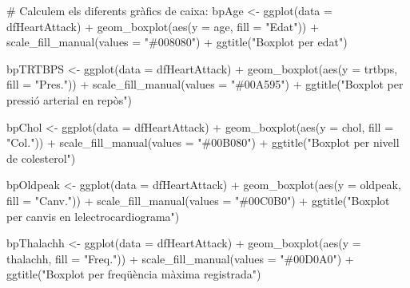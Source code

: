 \documentclass[
]{article}
\newenvironment{Shaded}{\begin{snugshade}}{\end{snugshade}}
\newcommand{\AttributeTok}[1]{\textcolor[rgb]{0.80,0.80,0.80}{#1}}
\newcommand{\CommentTok}[1]{\textcolor[rgb]{0.50,0.62,0.50}{#1}}
\newcommand{\FunctionTok}[1]{\textcolor[rgb]{0.94,0.94,0.56}{#1}}
\newcommand{\NormalTok}[1]{\textcolor[rgb]{0.80,0.80,0.80}{#1}}
\newcommand{\OtherTok}[1]{\textcolor[rgb]{0.94,0.94,0.56}{#1}}
\newcommand{\SpecialCharTok}[1]{\textcolor[rgb]{0.86,0.64,0.64}{#1}}
\newcommand{\StringTok}[1]{\textcolor[rgb]{0.80,0.58,0.58}{#1}}
\begin{document}
\begin{Shaded}
\begin{Highlighting}[]
\CommentTok{\# Calculem els diferents gràfics de caixa:}
\NormalTok{bpAge }\OtherTok{\textless{}{-}} \FunctionTok{ggplot}\NormalTok{(}\AttributeTok{data =}\NormalTok{ dfHeartAttack) }\SpecialCharTok{+}
  \FunctionTok{geom\_boxplot}\NormalTok{(}\FunctionTok{aes}\NormalTok{(}\AttributeTok{y =}\NormalTok{ age, }\AttributeTok{fill =} \StringTok{"Edat"}\NormalTok{)) }\SpecialCharTok{+}
  \FunctionTok{scale\_fill\_manual}\NormalTok{(}\AttributeTok{values =} \StringTok{"\#008080"}\NormalTok{) }\SpecialCharTok{+} 
  \FunctionTok{ggtitle}\NormalTok{(}\StringTok{"Boxplot per edat"}\NormalTok{)}

\NormalTok{bpTRTBPS }\OtherTok{\textless{}{-}} \FunctionTok{ggplot}\NormalTok{(}\AttributeTok{data =}\NormalTok{ dfHeartAttack) }\SpecialCharTok{+}
  \FunctionTok{geom\_boxplot}\NormalTok{(}\FunctionTok{aes}\NormalTok{(}\AttributeTok{y =}\NormalTok{ trtbps, }\AttributeTok{fill =} \StringTok{"Pres."}\NormalTok{)) }\SpecialCharTok{+}
  \FunctionTok{scale\_fill\_manual}\NormalTok{(}\AttributeTok{values =} \StringTok{"\#00A595"}\NormalTok{) }\SpecialCharTok{+} 
  \FunctionTok{ggtitle}\NormalTok{(}\StringTok{"Boxplot per pressió arterial en repòs"}\NormalTok{)}

\NormalTok{bpChol }\OtherTok{\textless{}{-}} \FunctionTok{ggplot}\NormalTok{(}\AttributeTok{data =}\NormalTok{ dfHeartAttack) }\SpecialCharTok{+}
  \FunctionTok{geom\_boxplot}\NormalTok{(}\FunctionTok{aes}\NormalTok{(}\AttributeTok{y =}\NormalTok{ chol, }\AttributeTok{fill =} \StringTok{"Col."}\NormalTok{)) }\SpecialCharTok{+}
  \FunctionTok{scale\_fill\_manual}\NormalTok{(}\AttributeTok{values =} \StringTok{"\#00B080"}\NormalTok{) }\SpecialCharTok{+} 
  \FunctionTok{ggtitle}\NormalTok{(}\StringTok{"Boxplot per nivell de colesterol"}\NormalTok{)}

\NormalTok{bpOldpeak }\OtherTok{\textless{}{-}} \FunctionTok{ggplot}\NormalTok{(}\AttributeTok{data =}\NormalTok{ dfHeartAttack) }\SpecialCharTok{+}
  \FunctionTok{geom\_boxplot}\NormalTok{(}\FunctionTok{aes}\NormalTok{(}\AttributeTok{y =}\NormalTok{ oldpeak, }\AttributeTok{fill =} \StringTok{"Canv."}\NormalTok{)) }\SpecialCharTok{+}
  \FunctionTok{scale\_fill\_manual}\NormalTok{(}\AttributeTok{values =} \StringTok{"\#00C0B0"}\NormalTok{) }\SpecialCharTok{+} 
  \FunctionTok{ggtitle}\NormalTok{(}\StringTok{"Boxplot per canvis en l\textquotesingle{}electrocardiograma"}\NormalTok{)}

\NormalTok{bpThalachh }\OtherTok{\textless{}{-}} \FunctionTok{ggplot}\NormalTok{(}\AttributeTok{data =}\NormalTok{ dfHeartAttack) }\SpecialCharTok{+}
  \FunctionTok{geom\_boxplot}\NormalTok{(}\FunctionTok{aes}\NormalTok{(}\AttributeTok{y =}\NormalTok{ thalachh, }\AttributeTok{fill =} \StringTok{"Freq."}\NormalTok{)) }\SpecialCharTok{+}
  \FunctionTok{scale\_fill\_manual}\NormalTok{(}\AttributeTok{values =} \StringTok{"\#00D0A0"}\NormalTok{) }\SpecialCharTok{+} 
  \FunctionTok{ggtitle}\NormalTok{(}\StringTok{"Boxplot per freqüència màxima registrada"}\NormalTok{)}


\end{Highlighting}
\end{Shaded}
\end{document}
